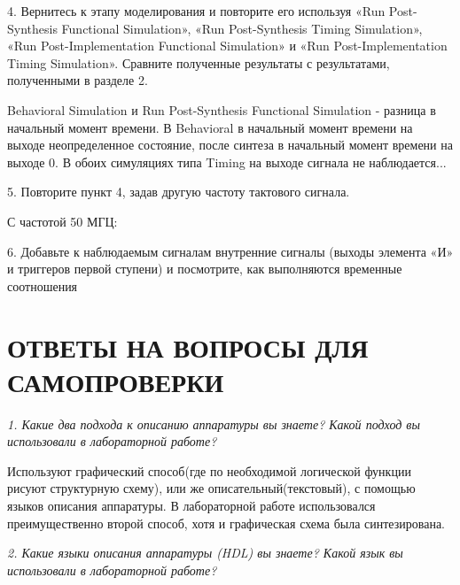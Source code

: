 \begin{sloppypar}
4. Вернитесь к этапу моделирования и повторите его используя «Run Post-Synthesis Functional Simulation», «Run Post-Synthesis Timing Simulation», «Run Post-Implementation Functional Simulation» и «Run Post-Implementation Timing Simulation». Сравните полученные результаты с результатами, полученными в разделе 2.


Behavioral Simulation и Run Post-Synthesis Functional Simulation - разница в начальный момент времени. В Behavioral в начальный момент времени на выходе  неопределенное состояние, после синтеза в начальный момент времени на выходе 0. В обоих симуляциях типа Timing на выходе сигнала не наблюдается...

5. Повторите пункт 4, задав другую частоту тактового сигнала.

С частотой 50 МГЦ: 




6. Добавьте к наблюдаемым сигналам внутренние сигналы (выходы элемента «И» и триггеров первой ступени) и посмотрите, как выполняются временные соотношения









\section*{ОТВЕТЫ НА ВОПРОСЫ ДЛЯ САМОПРОВЕРКИ}

\textit {1. Какие два подхода к описанию аппаратуры вы знаете? Какой подход
вы использовали в лабораторной работе?}

Используют графический способ(где по необходимой логической функции рисуют структурную схему), или же описательный(текстовый), с помощью языков описания аппаратуры. В лабораторной работе использовался преимущественно второй способ, хотя и графическая схема была синтезирована.

\textit {2. Какие языки описания аппаратуры (HDL) вы знаете? Какой язык вы
использовали в лабораторной работе?}


\end{sloppypar}
